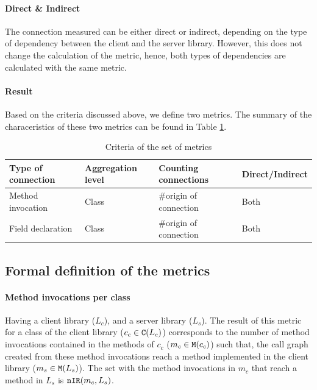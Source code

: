 \paragraph{Direct \& Indirect}

The connection measured can be either direct or indirect, depending on the type of dependency between the client and the server library. However, this does not change the calculation of the metric, hence, both types of dependencies are calculated with the same metric.

\paragraph{Result}
Based on the criteria discussed above, we define two metrics. The summary of the characeristics of these two metrics can be found in Table \ref{table:per-class-characteristics}.

\begin{table}[h]
    \begin{center}
    \begin{tabular}{|l|l|l|l|}
    \hline
    Type of connection & Aggregation level & Counting connections & Direct/Indirect \\ \hline
    Method invocation & Class & \#origin of connection & Both \\
    Field declaration & Class & \#origin of connection & Both \\
    \hline
    \end{tabular}
    \end{center}
    \caption{Criteria of the set of metrics}
    \label{table:per-class-characteristics}
\end{table}

\subsection{Formal definition of the metrics}

\paragraph{Method invocations per class}
Having a client library ($L_c$), and a server library ($L_s$). The result of this metric for a class of the client library ($c_c \in \verb|C|(L_c)$) corresponds to the number of method invocations contained in the methods of $c_c$ ($m_c \in \verb|M|(c_c)$) such that, the call graph created from these method invocations reach a method implemented in the client library ($m_s \in \verb|M|(L_s)$). The set with the method invocations in $m_c$ that reach a method in $L_s$ is $\verb|nIR|(m_c, L_s)$.

